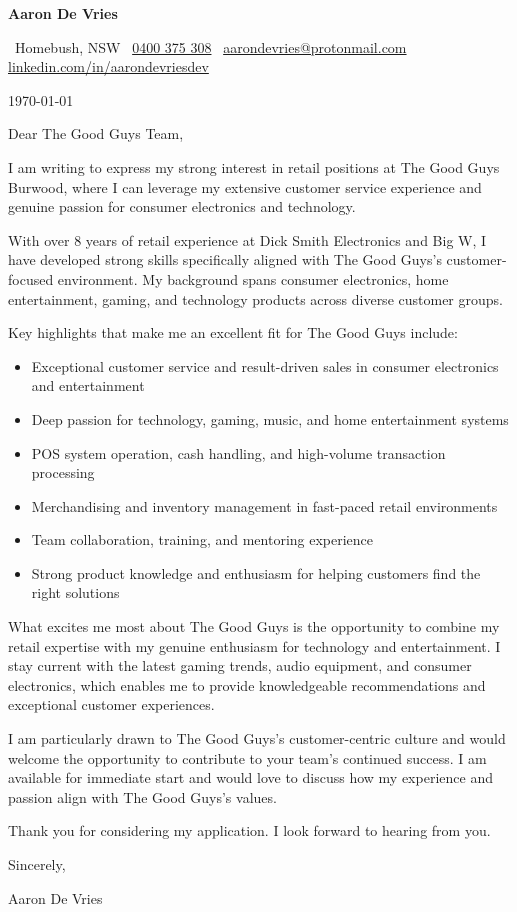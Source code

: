 \documentclass[a4paper,10pt]{article}
\makeatletter
\providecommand{\ContactBlock}{}
\renewcommand{\ContactBlock}{%
  {\Large \textbf{Aaron De Vries}}\par
  {\color{MidBlue}\small
  \faIcon{map-marker-alt}\, Homebush, NSW \quad\textbar\quad
  \faIcon{phone}\, \href{tel:+61400375308}{0400 375 308} \quad\textbar\quad
  \faIcon{envelope}\, \href{mailto:aarondevries@protonmail.com}{aarondevries@protonmail.com} \quad\textbar\quad
  \faIcon[brands]{linkedin}\, \href{https://linkedin.com/in/aarondevriesdev}{linkedin.com/in/aarondevriesdev}%
  }\par
}
\makeatother
\begin{document}
\ContactBlock

\vspace{1em}

\today

\vspace{1em}

Dear The Good Guys Team,

I am writing to express my strong interest in retail positions at The Good Guys Burwood, where I can leverage my extensive customer service experience and genuine passion for consumer electronics and technology.

With over 8 years of retail experience at Dick Smith Electronics and Big W, I have developed strong skills specifically aligned with The Good Guys's customer-focused environment. My background spans consumer electronics, home entertainment, gaming, and technology products across diverse customer groups.

Key highlights that make me an excellent fit for The Good Guys include:
\begin{itemize}
\item Exceptional customer service and result-driven sales in consumer electronics and entertainment
\item Deep passion for technology, gaming, music, and home entertainment systems
\item POS system operation, cash handling, and high-volume transaction processing
\item Merchandising and inventory management in fast-paced retail environments
\item Team collaboration, training, and mentoring experience
\item Strong product knowledge and enthusiasm for helping customers find the right solutions
\end{itemize}

What excites me most about The Good Guys is the opportunity to combine my retail expertise with my genuine enthusiasm for technology and entertainment. I stay current with the latest gaming trends, audio equipment, and consumer electronics, which enables me to provide knowledgeable recommendations and exceptional customer experiences.

I am particularly drawn to The Good Guys's customer-centric culture and would welcome the opportunity to contribute to your team's continued success. I am available for immediate start and would love to discuss how my experience and passion align with The Good Guys's values.

Thank you for considering my application. I look forward to hearing from you.

Sincerely,

Aaron De Vries
\end{document}
